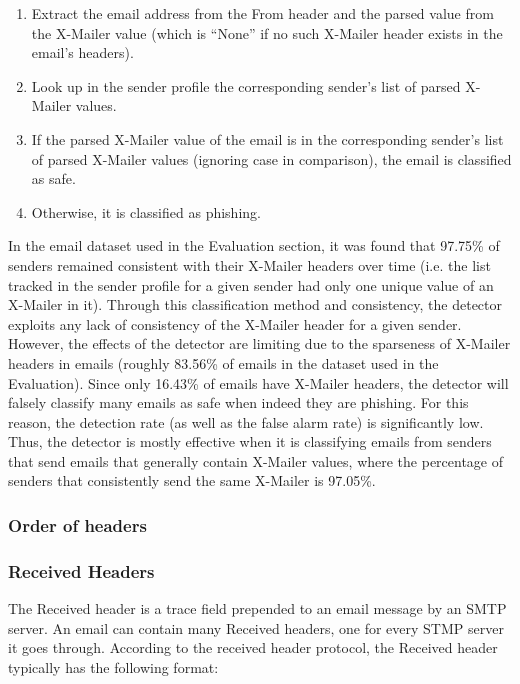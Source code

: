 \documentclass[letterpaper]{article}
\begin{document}
\begin{enumerate}
\item Extract the email address from the From header and the parsed value from the X-Mailer value (which is ``None'' if no such X-Mailer header exists in the email's headers).
\item Look up in the sender profile the corresponding sender's list of parsed X-Mailer values.
\item If the parsed X-Mailer value of the email is in the corresponding sender's list of parsed X-Mailer values (ignoring case in comparison), the email is classified as safe.
\item Otherwise, it is classified as phishing.
\end{enumerate}

In the email dataset used in the Evaluation section, it was found that 97.75\% of senders remained consistent with their X-Mailer headers over time (i.e. the list tracked in the sender profile for a given sender had only one unique value of an X-Mailer in it).  Through this classification method and consistency, the detector exploits any lack of consistency of the X-Mailer header for a given sender.  However, the effects of the detector are limiting due to the sparseness of X-Mailer headers in emails (roughly 83.56\% of emails in the dataset used in the Evaluation). Since only 16.43\% of emails have X-Mailer headers, the detector will falsely classify many emails as safe when indeed they are phishing. For this reason, the detection rate (as well as the false alarm rate) is significantly low. Thus, the detector is mostly effective when it is classifying emails from senders that send emails that generally contain X-Mailer values, where the percentage of senders that consistently send the same X-Mailer is 97.05\%.

\subsubsection{Order of headers}

\subsubsection{Received Headers}
The Received header is a trace field prepended to an email message by an SMTP server. An email can contain many Received headers, one for every STMP server it goes through. According to the received header protocol, the Received header typically has the following format:\\
\end{document}
